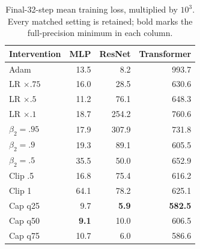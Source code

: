 \begin{table}[!t]
\caption{Final-32-step mean training loss, multiplied by $10^3$. Every matched setting is retained; bold marks the full-precision minimum in each column.}
\label{tab:app-late}
\centering\small
\setlength{\tabcolsep}{6pt}
\begin{tabular}{lrrr}
\toprule
Intervention & MLP & ResNet & Transformer \\
\midrule
Adam & 13.5 & 8.2 & 993.7 \\
LR $\times.75$ & 16.0 & 28.5 & 630.6 \\
LR $\times.5$ & 11.2 & 76.1 & 648.3 \\
LR $\times.1$ & 18.7 & 254.2 & 760.6 \\
$\beta_2=.95$ & 17.9 & 307.9 & 731.8 \\
$\beta_2=.9$ & 19.3 & 89.1 & 605.5 \\
$\beta_2=.5$ & 35.5 & 50.0 & 652.9 \\
Clip .5 & 16.8 & 75.4 & 616.2 \\
Clip 1 & 64.1 & 78.2 & 625.1 \\
Cap q25 & 9.7 & \textbf{5.9} & \textbf{582.5} \\
Cap q50 & \textbf{9.1} & 10.0 & 606.5 \\
Cap q75 & 10.7 & 6.0 & 586.6 \\
\bottomrule
\end{tabular}
\end{table}
